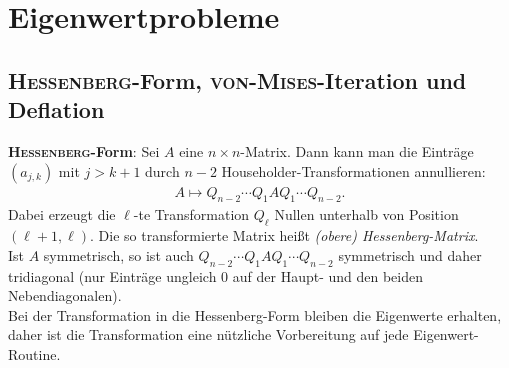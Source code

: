 \section{%
    Eigenwertprobleme%
}

\subsection{%
    \textsc{Hessenberg}-Form, \textsc{von-Mises}-Iteration und Deflation%
}

\textbf{\textsc{Hessenberg}-Form}:
Sei $A$ eine $n \times n$-Matrix.
Dann kann man die Einträge $(a_{j,k})$ mit $j > k + 1$ durch $n - 2$
Householder-Transformationen annullieren:
\begin{align*}
    A \mapsto Q_{n-2} \dotsm Q_1 A Q_1 \dotsm Q_{n-2}.
\end{align*}
Dabei erzeugt die $\ell$-te Transformation $Q_\ell$ Nullen unterhalb
von Position $(\ell + 1, \ell)$.
Die so transformierte Matrix heißt
\emph{(obere) Hessenberg-Matrix}. \\
Ist $A$ symmetrisch, so ist auch $Q_{n-2} \dotsm Q_1 A Q_1 \dotsm Q_{n-2}$
symmetrisch und daher tridiagonal (nur Einträge ungleich $0$ auf der Haupt-
und den beiden Nebendiagonalen). \\
Bei der Transformation in die Hessenberg-Form bleiben die Eigenwerte erhalten,
daher ist die Transformation eine nützliche Vorbereitung auf jede
Eigenwert-Routine.

